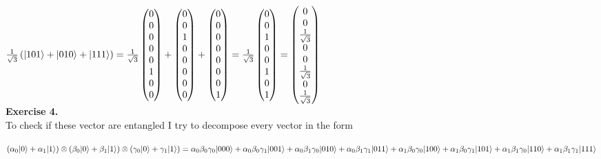 \documentclass{article}
\DeclarePairedDelimiter\ket{\lvert}{\rangle}
\begin{document}
\(
\frac{1}{\sqrt{3}} \left(\ket{101} + \ket{010} + \ket{111} \right) = \frac{1}{\sqrt{3}} \begin{pmatrix} 0 \\ 0 \\ 0 \\ 0 \\ 0 \\ 1 \\ 0 \\ 0 \end{pmatrix} + \begin{pmatrix} 0 \\ 0 \\ 1 \\ 0 \\ 0 \\ 0 \\ 0 \\ 0 \end{pmatrix} +  \begin{pmatrix} 0 \\ 0 \\ 0 \\ 0 \\ 0 \\ 0 \\ 0 \\ 1 \end{pmatrix} = 
\frac{1}{\sqrt{3}} \begin{pmatrix} 0 \\ 0 \\ 1 \\ 0 \\ 0 \\ 1 \\ 0 \\ 1 \end{pmatrix} =
\begin{pmatrix} 0 \\ 0 \\ \frac{1}{\sqrt{3}}  \\ 0 \\ 0 \\ \frac{1}{\sqrt{3}}  \\ 0 \\ \frac{1}{\sqrt{3}}  \end{pmatrix}
\)
\pagebreak
\\
\textbf{Exercise 4.}\\

To check if these vector are entangled I try to decompose every vector in the form

\(
\left( \alpha_{0} \ket{0} + \alpha_{1} \ket{1} \right) \otimes \left( \beta_{0} \ket{0} + \beta_{1} \ket{1} \right) \otimes \left( \gamma_{0} \ket{0} + \gamma_{1} \ket{1} \right) = \\
\alpha_{0} \beta_{0} \gamma_{0} \ket{000} + 
\alpha_{0} \beta_{0} \gamma_{1} \ket{001} + 
\alpha_{0} \beta_{1} \gamma_{0} \ket{010} + 
\alpha_{0} \beta_{1} \gamma_{1} \ket{011} + 
\alpha_{1} \beta_{0} \gamma_{0} \ket{100} + 
\alpha_{1} \beta_{0} \gamma_{1} \ket{101} +
\alpha_{1} \beta_{1} \gamma_{0} \ket{110} +
\alpha_{1} \beta_{1} \gamma_{1} \ket{111}
\)
\end{document}
